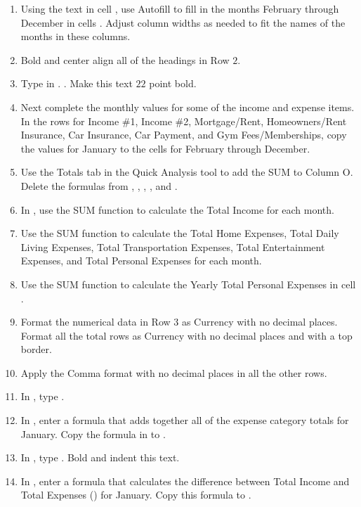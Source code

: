 \begin{enumerate}
	\item Using the text in cell , use Autofill to fill in the months February through December in cells . Adjust column widths as needed to fit the names of the months in these columns.
	\item Bold and center align all of the headings in Row $ 2 $.
	\item Type  in .  . Make this text $ 22 $ point bold.
	\item Next complete the monthly values for some of the income and expense items. In the rows for Income \#1, Income \#2, Mortgage/Rent, Homeowners/Rent Insurance, Car Insurance, Car Payment, and Gym Fees/Memberships, copy the values for January to the cells for February through December.
	\item Use the Totals tab in the Quick Analysis tool to add the SUM to Column O. Delete the formulas from , , , , and .
	\item In , use the SUM function to calculate the Total Income for each month.
	\item Use the SUM function to calculate the Total Home Expenses, Total Daily Living Expenses, Total Transportation Expenses, Total Entertainment Expenses, and Total Personal Expenses for each month.
	\item Use the SUM function to calculate the Yearly Total Personal Expenses in cell .
	\item Format the numerical data in Row $ 3 $ as Currency with no decimal places. Format all the total rows as Currency with no decimal places and with a top border.
	\item Apply the Comma format with no decimal places in all the other rows.
	\item In , type .
	\item In , enter a formula that adds together all of the expense category totals for January. Copy the formula in  to .
	\item In , type . Bold and indent this text.
	\item In , enter a formula that calculates the difference between Total Income and Total Expenses () for January. Copy this formula to .

\end{enumerate}
